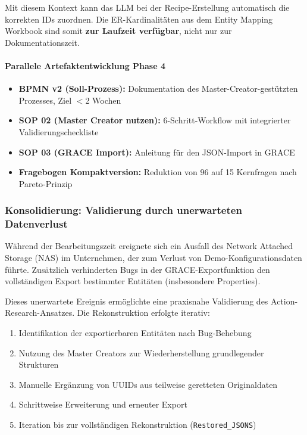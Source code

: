 Mit diesem Kontext kann das LLM bei der Recipe-Erstellung automatisch die korrekten IDs zuordnen. Die ER-Kardinalitäten aus dem Entity Mapping Workbook sind somit \textbf{zur Laufzeit verfügbar}, nicht nur zur Dokumentationszeit.

\paragraph{Parallele Artefaktentwicklung Phase 4}

\begin{itemize}
    \item \textbf{BPMN v2 (Soll-Prozess):} Dokumentation des Master-Creator-gestützten Prozesses, Ziel $<$2 Wochen
    \item \textbf{SOP 02 (Master Creator nutzen):} 6-Schritt-Workflow mit integrierter Validierungscheckliste
    \item \textbf{SOP 03 (GRACE Import):} Anleitung für den JSON-Import in GRACE
    \item \textbf{Fragebogen Kompaktversion:} Reduktion von 96 auf 15 Kernfragen nach Pareto-Prinzip
\end{itemize}


\subsubsection{Konsolidierung: Validierung durch unerwarteten Datenverlust}
\label{subsubsec:NASCrashKonsolidierung}

Während der Bearbeitungszeit ereignete sich ein Ausfall des Network Attached Storage (NAS) im Unternehmen, der zum Verlust von Demo-Konfigurationsdaten führte. Zusätzlich verhinderten Bugs in der GRACE-Exportfunktion den vollständigen Export bestimmter Entitäten (insbesondere Properties).

Dieses unerwartete Ereignis ermöglichte eine praxisnahe Validierung des Action-Research-Ansatzes. Die Rekonstruktion erfolgte iterativ:

\begin{enumerate}
    \item Identifikation der exportierbaren Entitäten nach Bug-Behebung
    \item Nutzung des Master Creators zur Wiederherstellung grundlegender Strukturen
    \item Manuelle Ergänzung von UUIDs aus teilweise geretteten Originaldaten
    \item Schrittweise Erweiterung und erneuter Export
    \item Iteration bis zur vollständigen Rekonstruktion (\texttt{Restored\_JSONS})
\end{enumerate}

